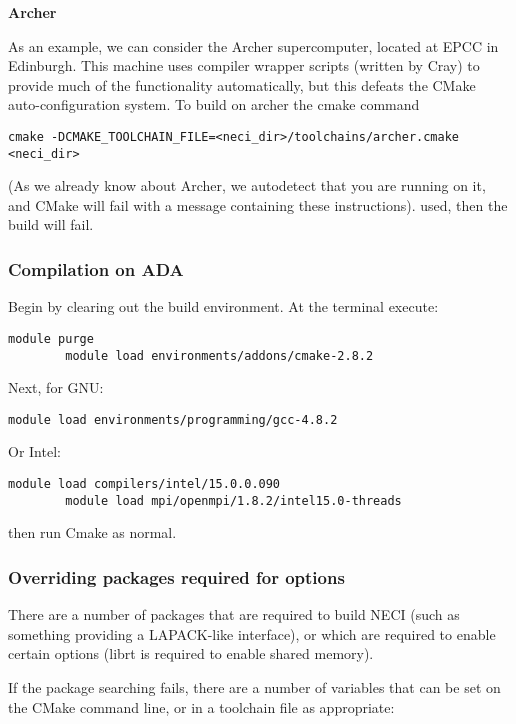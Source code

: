 \documentclass[a4paper,notitlepage,dvipsnames]{scrreprt}
\begin{document}
    \textbf{Archer}

    As an example, we can consider the Archer supercomputer, located at EPCC in Edinburgh. This
    machine uses compiler wrapper scripts (written by Cray) to provide much of the functionality
    automatically, but this defeats the CMake auto-configuration system. To build on archer the
    cmake command
    \begin{lstlisting}[gobble=4]
        cmake -DCMAKE_TOOLCHAIN_FILE=<neci_dir>/toolchains/archer.cmake <neci_dir>
    \end{lstlisting}

    (As we already know about Archer, we autodetect that you are running on it, and CMake will
    fail with a message containing these instructions).
	used, then the build will fail.

\subsubsection{Compilation on ADA}
	Begin by clearing out the build environment. At the terminal execute:
	\begin{lstlisting}[gobble=4]
		module purge
		module load environments/addons/cmake-2.8.2
	\end{lstlisting}
	Next, for GNU:
	\begin{lstlisting}[gobble=4]
		module load environments/programming/gcc-4.8.2
	\end{lstlisting}
	Or Intel:
	\begin{lstlisting}[gobble=4]
		module load compilers/intel/15.0.0.090
		module load mpi/openmpi/1.8.2/intel15.0-threads
	\end{lstlisting}
	then run Cmake as normal.

\subsubsection{Overriding packages required for options}

    There are a number of packages that are required to build NECI (such as something providing
    a LAPACK-like interface), or which are required to enable certain options (librt is required
    to enable shared memory).

    If the package searching fails, there are a number of variables that can be set on the CMake
    command line, or in a toolchain file as appropriate:
\end{document}
